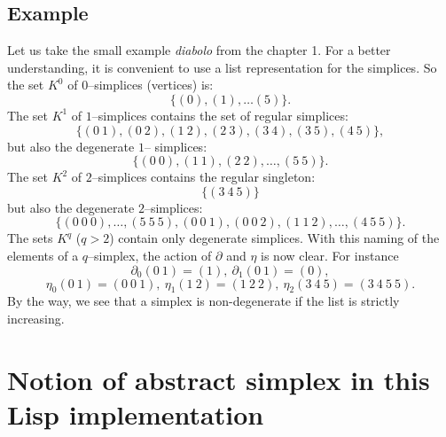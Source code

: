 \subsection* {Example}

Let us take the small example {\em diabolo} from the chapter 1.
For a better understanding, it is convenient to use a list representation for the
simplices. So the set $K^0$ of $0$--simplices (vertices) is:
$$\lbrace (0), (1),\ldots (5) \rbrace.$$
The set $K^1$ of $1$--simplices contains the set of regular simplices:
$$\lbrace (0\  1), (0\  2), (1\  2), (2\  3), (3\  4), (3\  5), (4\  5) \rbrace,$$
but also the degenerate $1$-- simplices:
$$\lbrace (0\ 0), (1\ 1), (2\ 2),\ldots,(5 \ 5) \rbrace.$$
The set $K^2$ of $2$--simplices contains the regular singleton:  
$$\lbrace ( 3\  4\  5) \rbrace$$
but also the degenerate $2$--simplices:
$$\lbrace (0\ 0\ 0), \ldots, (5\ 5\ 5), (0\ 0\ 1), (0\ 0\  2), (1\ 1\ 2), \ldots, (4\ 5\ 5)\rbrace.$$
The sets $K^q$ ($q >2$) contain only degenerate simplices.
With this  naming of the elements of a $q$--simplex, the action of $\partial$ and $\eta$ is now clear. For
instance
$$\partial_0 (0\  1) = (1),\  \partial_1 (0\  1) = (0),$$
$$\eta_0 (0\  1) = (0\  0\  1),\ 
  \eta_1 (1\  2)= (1\  2\  2),\ \eta_2(3\ 4\ 5)=(3\ 4\ 5\ 5). $$
By the way, we see that a simplex is non-degenerate if the list is strictly increasing.

\section {Notion of abstract simplex in this Lisp implementation}


